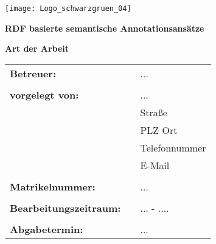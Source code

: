 \documentclass[12pt,
				a4paper,
				twoside=false,
				titlepage=true,
				bibliography=totoc, %
				listof=totoc, %
				numbers=noenddot]{scrartcl}
\begin{document}

\begin{titlepage}
\begin{minipage}{1\textwidth}
\flushright 
   \texttt{[image: Logo\_schwarzgruen\_04]}
\end{minipage}

\vspace{3cm}
\begin{center}
\textbf{\LARGE{RDF basierte semantische Annotationsansätze}}
\\
\end{center}
\vspace{1.5cm}

\begin{center}
\textbf{Art der Arbeit}
\end{center}

\vspace{3.5cm}

\begin{flushleft}
\begin{tabular}{lll}
\textbf{Betreuer:} & &  ...\\
& & \\
\textbf{vorgelegt von:}& & ...\\
& & Straße\\
& & PLZ Ort\\
& & Telefonnummer\\
& & E-Mail\\
& & \\
\textbf{Matrikelnummer:} & & ...\\
& & \\

\textbf{Bearbeitungszeitraum:} & & ... - ....\\
& & \\

\textbf{Abgabetermin:} & & ...
\end{tabular}
\end{flushleft}
\end{titlepage}


\setcounter{page}{2}
\newpage
\tableofcontents %
\newpage
\listoffigures %
\newpage 
\listoftables %
\newpage
\listofformels %
\newpage
\newpage









\setcounter{page}{9}

\printbibliography[heading=head]


\end{document}
